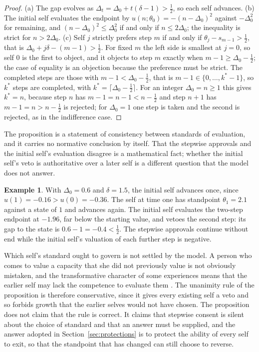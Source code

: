 \documentclass[11pt]{article}
\theoremstyle{plain}
\theoremstyle{definition}
\newtheorem{example}{Example}
\theoremstyle{remark}
\begin{document}
\begin{proof}
(a) The gap evolves as $\Delta_t=\Delta_0+t(\delta-1)>\tfrac12$, so each self advances. (b) The initial self evaluates the endpoint by $u(n;\theta_0)=-(n-\Delta_0)^2$ against $-\Delta_0^2$ for remaining, and $(n-\Delta_0)^2\le\Delta_0^2$ if and only if $n\le2\Delta_0$; the inequality is strict for $n>2\Delta_0$. (c) Self $j$ strictly prefers step $m$ if and only if $\theta_j-s_{m-1}>\tfrac12$, that is $\Delta_0+j\delta-(m-1)>\tfrac12$. For fixed $m$ the left side is smallest at $j=0$, so self $0$ is the first to object, and it objects to step $m$ exactly when $m-1\ge\Delta_0-\tfrac12$; the case of equality is an objection because the preference must be strict. The completed steps are those with $m-1<\Delta_0-\tfrac12$, that is $m-1\in\{0,\dots,k^\ast-1\}$, so $k^\ast$ steps are completed, with $k^\ast=\lceil\Delta_0-\tfrac12\rceil$. For an integer $\Delta_0=n\ge1$ this gives $k^\ast=n$, because step $n$ has $m-1=n-1<n-\tfrac12$ and step $n+1$ has $m-1=n>n-\tfrac12$ is rejected; for $\Delta_0=1$ one step is taken and the second is rejected, as in the indifference case.
\end{proof}

\noindent The proposition is a statement of consistency between standards of evaluation, and it carries no normative conclusion by itself. That the stepwise approvals and the initial self's evaluation disagree is a mathematical fact; whether the initial self's veto is authoritative over a later self is a different question that the model does not answer.

\begin{example}
With $\Delta_0=0.6$ and $\delta=1.5$, the initial self advances once, since $u(1)=-0.16>u(0)=-0.36$. The self at time one has standpoint $\theta_1=2.1$ against a state of $1$ and advances again. The initial self evaluates the two-step endpoint at $-1.96$, far below the starting value, and vetoes the second step: its gap to the state is $0.6-1=-0.4<\tfrac12$. The stepwise approvals continue without end while the initial self's valuation of each further step is negative.
\end{example}

Which self's standard ought to govern is not settled by the model. A person who comes to value a capacity that she did not previously value is not obviously mistaken, and the transformative character of some experiences means that the earlier self may lack the competence to evaluate them \cite{paul2014}. The unanimity rule of the proposition is therefore conservative, since it gives every existing self a veto and so forbids growth that the earlier selves would not have chosen. The proposition does not claim that the rule is correct. It claims that stepwise consent is silent about the choice of standard and that an answer must be supplied, and the answer adopted in Section~\ref{sec:protections} is to protect the ability of every self to exit, so that the standpoint that has changed can still choose to reverse.
\end{document}

